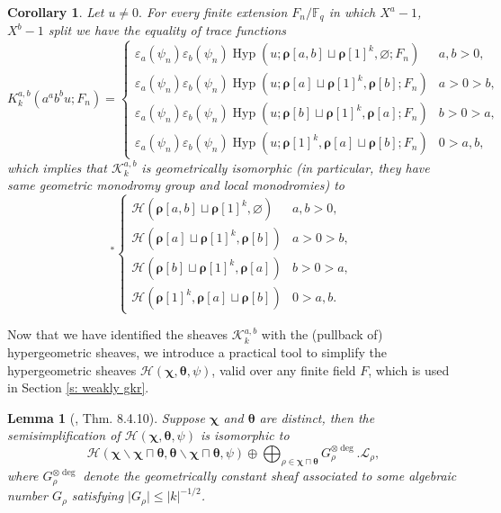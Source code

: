 \documentclass[12pt]{amsart}
\theoremstyle{plain}
\newtheorem{lem}[thm]{Lemma}
\newtheorem{cor}[thm]{Corollary}
\theoremstyle{definition}
\theoremstyle{remark}
\numberwithin{equation}{section}
\newcommand{\FF}{\mathbb{F}}
\renewcommand{\leq}{\leqslant}
\begin{document}
\begin{cor}\label{cor: K_k is hypergeometric}Let $u\neq 0.$ For every finite extension $F_n/\FF_q$ in which $X^a-1$, $X^b-1$ split we have the equality of trace functions   \begin{equation*}
    K_k^{a,b}(a^ab^bu;F_n) = \begin{cases}
        \varepsilon_a(\psi_n)\varepsilon_b(\psi_n)\operatorname{Hyp}(u;\bm{\rho} [a,b]\sqcup \bm{\rho} [1]^k,\varnothing;F_n)&  a,b>0, \\
        \varepsilon_a(\psi_n)\varepsilon_b(\psi_n)\operatorname{Hyp}(u;\bm{\rho}[a]\sqcup \bm{\rho}[1]^k,\bm{\rho}[b];F_n)& a>0>b, \\
        \varepsilon_a(\psi_n)\varepsilon_b(\psi_n)\operatorname{Hyp}(u;\bm{\rho}[b]\sqcup \bm{\rho}[1]^k,\bm{\rho}[a];F_n)& b>0>a,\ \\\varepsilon_a(\psi_n)\varepsilon_b(\psi_n)
        \operatorname{Hyp}(u;\bm{\rho}[1]^k,\bm{\rho}[a]\sqcup \bm{\rho}[b];F_n)&0>a,b,
    \end{cases}
\end{equation*}
which implies that $\mathcal{K}_k^{a,b}$ is geometrically isomorphic (in particular, they have same geometric monodromy group and local monodromies) to 
\begin{equation*}
    [\times (a^ab^b)^{-1}]^*\begin{cases}
        \mathcal{H}(\bm{\rho} [a,b]\sqcup \bm{\rho} [1]^k,\varnothing)&  a,b>0, \\
      \mathcal{H}(\bm{\rho}[a]\sqcup \bm{\rho}[1]^k,\bm{\rho}[b])& a>0>b, \\
       \mathcal{H}(\bm{\rho}[b]\sqcup \bm{\rho}[1]^k,\bm{\rho}[a])& b>0>a,\ \\
        \mathcal{H}(\bm{\rho}[1]^k,\bm{\rho}[a]\sqcup \bm{\rho}[b])&0>a,b.
    \end{cases} 
\end{equation*}
\end{cor}


Now that we have identified the sheaves $\mathcal{K}_k^{a,b}$ with the (pullback of) hypergeometric sheaves, we introduce a practical tool to simplify the hypergeometric sheaves $\mathcal{H}(\bm{\chi},\bm{\theta},\psi)$, valid over any finite field $F$, which is used in Section \ref{s: weakly gkr}.



\begin{lem}[\cite{Katzbook}, Thm. 8.4.10]
    Suppose $\bm{\chi}$ and $\bm{\theta}$ are distinct, then the semisimplification of $\mathcal{H}(\bm{\chi},\bm{\theta},\psi)$ is isomorphic to 
    \[\mathcal{H}(\bm{\chi}\smallsetminus\bm{\chi}\sqcap\bm{\theta},\bm{\theta}\smallsetminus\bm{\chi}\sqcap\bm{\theta},\psi) \oplus \bigoplus_{\rho\in \bm{\chi}\sqcap\bm{\theta}}G_{\rho}^{\otimes \operatorname{deg}}.\mathcal{L}_{\rho},\]
    where $G_{\rho}^{\otimes \operatorname{deg}}$ denote the geometrically constant sheaf associated to some algebraic number $G_{\rho}$ satisfying $\vert{G_{\rho}}\vert \leq \vert{k}\vert^{-1/2}$.
\end{lem}
\end{document}
